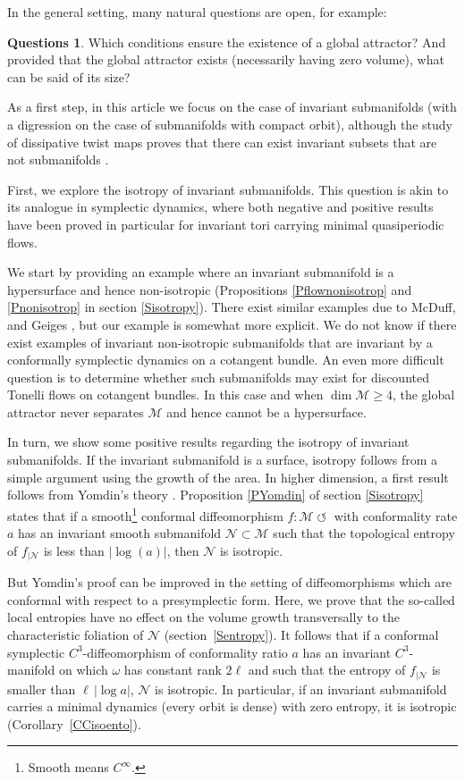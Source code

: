 \documentclass[11pt]{article}
\numberwithin{equation}{section}
\numberwithin{figure}{section}
\numberwithin{table}{section}
\providecommand{\righttoleftarrow}{\mathrel{\circlearrowleft}}
\theoremstyle{definition}
\newtheorem*{questions*}{Questions}
\def\cM{{\mathcal M}}
\def\cN{{\mathcal N}}
\begin{document}
In the general setting, many natural questions are open, for example:

\begin{questions*}
Which conditions ensure the existence of a global attractor? And provided that the global attractor exists (necessarily having zero volume), what can be said of its size?
\end{questions*}

As a first step, in this article we focus on the case of invariant submanifolds (with a digression on the case of submanifolds with compact orbit), although the study of dissipative twist maps proves that there can exist invariant subsets that are not submanifolds \cite{LeCalvez1988}.

First, we explore the isotropy of invariant submanifolds. This question is akin to its analogue in symplectic dynamics, where both negative and positive results have been proved in particular for invariant tori carrying minimal quasiperiodic flows.

We start by providing an example where an invariant submanifold is a hypersurface and hence non-isotropic (Propositions \ref{Pflownonisotrop} and \ref{Pnonisotrop} in section \ref{Sisotropy}). There exist similar examples due to McDuff, \cite{McDuff1991} and Geiges \cite{Geiges1994,Geiges1995}, but our example is somewhat more explicit. We do not know if there exist examples of invariant non-isotropic submanifolds that are invariant by a conformally symplectic dynamics on a cotangent bundle. An even more difficult question is to determine whether such submanifolds may exist for discounted Tonelli flows on cotangent bundles. In this case and when $\dim \cM\geq 4$, the global attractor never separates $\cM$ and hence cannot be a hypersurface.

In turn, we show some positive results regarding the isotropy of invariant submanifolds. If the invariant submanifold is a surface, isotropy follows from a simple argument using the growth of the area. In higher dimension, a first result follows from Yomdin's theory \cite{Yom1987, Gromov1987}. Proposition \ref{PYomdin} of section \ref{Sisotropy} states that if a smooth\footnote{Smooth means $C^\infty$.} conformal diffeomorphism $f: \cM \righttoleftarrow$ with conformality rate $a$ has an invariant smooth submanifold $\cN \subset \cM$ such that the topological entropy of $f_{|\cN}$ is less than $|\log(a)|$, then $\cN$ is isotropic.

But Yomdin's proof can be improved in the setting of diffeomorphisms which are conformal with respect to a presymplectic form. Here, we prove that the so-called local entropies have no effect on the volume growth transversally to the characteristic foliation of $\cN$ (section~\ref{Sentropy}). It follows that if a conformal symplectic $C^3$-diffeomorphism
of conformality ratio $a$ has an invariant $C^3$-manifold on which $\omega$ has constant rank $2\ell$ and such that the entropy of $f_{|\cN}$ is smaller than $\ell\, |\log a|$, $\cN$ is isotropic. In particular, if an invariant submanifold carries a minimal dynamics (every orbit is dense) with zero entropy, it is isotropic (Corollary~\ref{CCisoento}).
\end{document}
